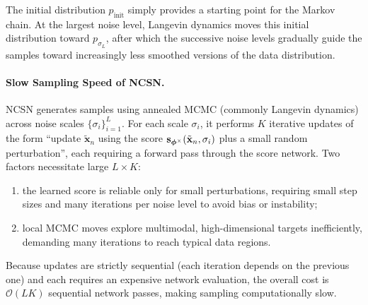 The initial distribution $p_{\mathrm{init}}$ simply provides a starting point
for the Markov chain. At the largest noise level, Langevin dynamics moves this
initial distribution toward $p_{\sigma_L}$, after which the successive noise
levels gradually guide the samples toward increasingly less smoothed versions
of the data distribution.

\paragraph{Slow Sampling Speed of NCSN.}
NCSN generates samples using annealed MCMC (commonly Langevin dynamics) across noise scales $\{\sigma_i\}_{i=1}^L$.  
For each scale $\sigma_i$, it performs $K$ iterative updates of the form ``update $\tilde{\mathbf{x}}_n$ using the score ${\mathbf{s}}_{\bm{\phi}^\times}(\tilde{\mathbf{x}}_n,\sigma_i)$ plus a small random perturbation'', each requiring a forward pass through the score network. Two factors necessitate large $L \times K$:  
\begin{enumerate}
    \item[(i)]  the learned score is reliable only for small perturbations, requiring small step sizes and many iterations per noise level to avoid bias or instability;
    \item[(ii)]  local MCMC moves explore multimodal, high-dimensional targets inefficiently, demanding many iterations to reach typical data regions.
\end{enumerate}
Because updates are strictly sequential (each iteration depends on the previous one) and each requires an expensive network evaluation, the overall cost is $\mathcal{O}(L  K)$ sequential network passes, making sampling computationally slow.


